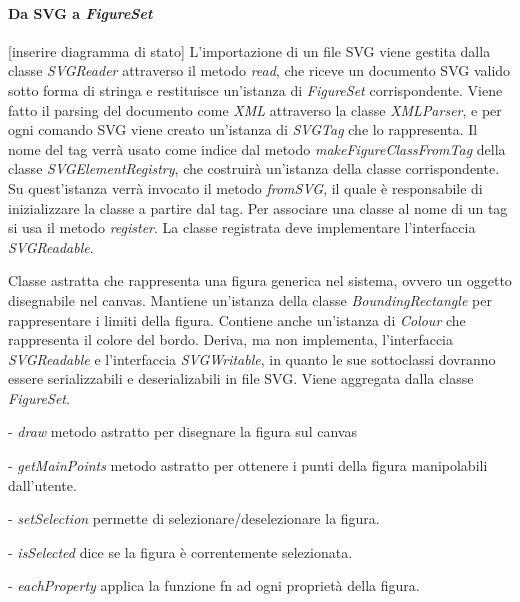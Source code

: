 \paragraph{Da SVG a \textit{FigureSet}}
[inserire diagramma di stato]
L'importazione di un file SVG viene gestita dalla classe \textit{SVGReader} attraverso il metodo \textit{read}, che riceve un documento SVG valido sotto forma di stringa e restituisce un'istanza di \textit{FigureSet} corrispondente. Viene fatto il parsing del documento come \textit{XML} attraverso la classe \textit{XMLParser}, e per ogni comando SVG viene creato un'istanza di \textit{SVGTag} che lo rappresenta. Il nome del tag verr\`a usato come indice dal metodo \textit{makeFigureClassFromTag} della classe \textit{SVGElementRegistry}, che costruir\`a un'istanza della classe corrispondente. Su quest'istanza verr\`a invocato il metodo \textit{fromSVG}, il quale \`e responsabile di inizializzare la classe a partire dal tag. Per associare una classe al nome di un tag si usa il metodo \textit{register}. La classe registrata deve implementare l'interfaccia \textit{SVGReadable}. 


Classe astratta che rappresenta una figura generica nel sistema, ovvero un oggetto disegnabile nel canvas.
Mantiene un'istanza della classe \textit{BoundingRectangle} per rappresentare i limiti della figura. Contiene anche un'istanza di \textit{Colour} che rappresenta il colore del bordo. Deriva, ma non implementa, l'interfaccia \textit{SVGReadable} e l'interfaccia \textit{SVGWritable}, in quanto le sue sottoclassi dovranno essere serializzabili e deserializabili in file SVG.
Viene aggregata dalla classe \textit{FigureSet}.
\begin{elencopuntato}[\normindent]
\item[-]  \textit{draw} metodo astratto per disegnare la figura sul canvas
\item[-]  \textit{getMainPoints} metodo astratto per ottenere i punti della figura manipolabili dall'utente.
\item[-]  \textit{setSelection} permette di selezionare/deselezionare la figura.
\item[-]  \textit{isSelected} dice se la figura \`e correntemente selezionata.
\item[-]  \textit{eachProperty} applica la funzione fn ad ogni propriet\`a della figura.
\end{elencopuntato}

